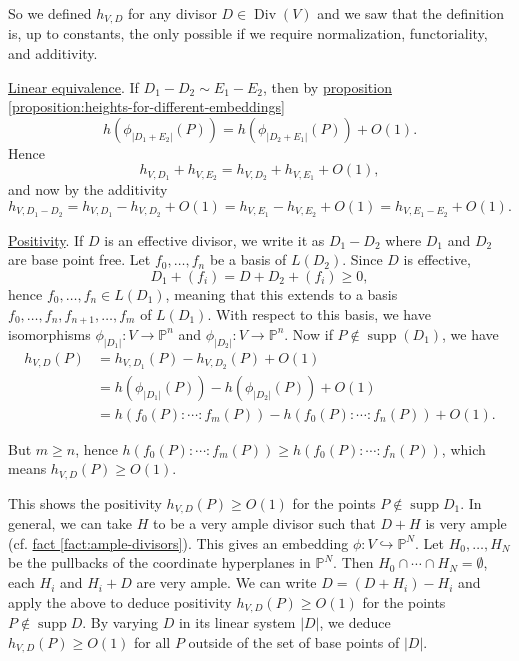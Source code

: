\documentclass{article}
\newcommand{\refref}[2]{\hyperref[#2]{#1 \ref*{#2}}}
\theoremstyle{definition}
\DeclareMathOperator{\supp}{supp}
\DeclareMathOperator{\Div}{Div}
\newcommand{\PP}{\mathbb{P}}
\begin{document}
So we defined $h_{V,D}$ for any divisor $D \in \Div (V)$ and we saw that the
definition is, up to constants, the only possible if we require normalization,
functoriality, and additivity.

\vspace{1em}

\noindent\underline{Linear equivalence}. If $D_1 - D_2 \sim E_1 - E_2$, then by
\refref{proposition}{proposition:heights-for-different-embeddings}
$$h (\phi_{|D_1+E_2|} (P)) = h (\phi_{|D_2 + E_1|} (P)) + O(1).$$
Hence
$$h_{V,D_1} + h_{V,E_2} = h_{V,D_2} + h_{V,E_1} + O (1),$$
and now by the additivity
\[ h_{V,D_1-D_2} =
  h_{V,D_1} - h_{V,D_2} + O (1) =
  h_{V,E_1} - h_{V,E_2} + O (1) =
  h_{V,E_1-E_2} + O (1). \]

\vspace{1em}

\noindent\underline{Positivity}. If $D$ is an effective divisor, we write it as
$D_1 - D_2$ where $D_1$ and $D_2$ are base point free. Let $f_0, \ldots, f_n$ be
a basis of $L (D_2)$. Since $D$ is effective,
$$D_1 + (f_i) = D + D_2 + (f_i) \ge 0,$$
hence $f_0, \ldots, f_n \in L (D_1)$, meaning that this extends to a basis
$f_0, \ldots, f_n, f_{n+1}, \ldots, f_m$ of $L (D_1)$. With respect to this
basis, we have isomorphisms $\phi_{|D_1|}\colon V\to \PP^n$ and
$\phi_{|D_2|}\colon V\to \PP^n$. Now if $P \notin \supp (D_1)$, we have
\begin{align*}
  h_{V,D} (P) & = h_{V,D_1} (P) - h_{V,D_2} (P) + O (1) \\
              & = h (\phi_{|D_1|} (P)) - h (\phi_{|D_2|} (P)) + O (1) \\
              & = h (f_0 (P) : \cdots : f_m (P)) - h (f_0 (P) : \cdots : f_n (P)) + O (1).
\end{align*}

But $m \ge n$, hence
$h (f_0 (P) : \cdots : f_m (P)) \ge h (f_0 (P) : \cdots : f_n (P))$, which means
$h_{V,D} (P) \ge O (1)$.

This shows the positivity $h_{V,D} (P) \ge O (1)$ for the points
$P \notin \supp D_1$. In general, we can take $H$ to be a very ample divisor
such that $D+H$ is very ample (cf. \refref{fact}{fact:ample-divisors}). This
gives an embedding $\phi\colon V\hookrightarrow \PP^N$. Let $H_0,\ldots,H_N$ be
the pullbacks of the coordinate hyperplanes in $\PP^N$. Then
$H_0 \cap \cdots \cap H_N = \emptyset$, each $H_i$ and $H_i + D$ are very
ample. We can write $D = (D+H_i) - H_i$ and apply the above to deduce positivity
$h_{V,D} (P) \ge O (1)$ for the points $P \notin \supp D$. By varying $D$ in its
linear system $|D|$, we deduce $h_{V,D} (P) \ge O (1)$ for all $P$ outside of
the set of base points of $|D|$.
\end{document}
